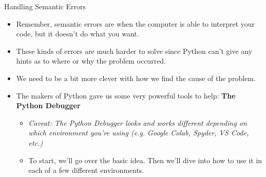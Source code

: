 \documentclass[10pt, aspectratio=169]{beamer}
\begin{document}
\begin{frame}{Handling Semantic Errors}
    \begin{itemize}
        \item Remember, semantic errors are when the computer is able to interpret your code, but it doesn't do what you want.
        \item These kinds of errors are much harder to solve since Python can't give any hints as to where or why the problem occurred.
        \vspace{0.5cm}
        \item We need to be a bit more clever with how we find the cause of the problem.
        \item The makers of Python gave us some very powerful tools to help: \textbf{The Python Debugger}
        \begin{itemize}
            \item \textit{Caveat: The Python Debugger looks and works different depending on which environment you're using (e.g. Google Colab, Spyder, VS Code, etc.)}
            \item To start, we'll go over the basic idea. Then we'll dive into how to use it in each of a few different environments.
        \end{itemize}
    \end{itemize}
\end{frame}
\end{document}
